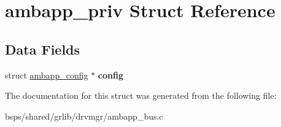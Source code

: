 \hypertarget{structambapp__priv}{}\section{ambapp\+\_\+priv Struct Reference}
\label{structambapp__priv}
\subsection*{Data Fields}
\begin{DoxyCompactItemize}
\item 
\mbox{\label{structambapp__priv_a7ce9acd76e49be15c2382faa494cf306}} 
struct \mbox{\hyperlink{structambapp__config}{ambapp\+\_\+config}} $\ast$ {\bfseries config}
\end{DoxyCompactItemize}


The documentation for this struct was generated from the following file\+:\begin{DoxyCompactItemize}
\item 
bsps/shared/grlib/drvmgr/ambapp\+\_\+bus.\+c\end{DoxyCompactItemize}
